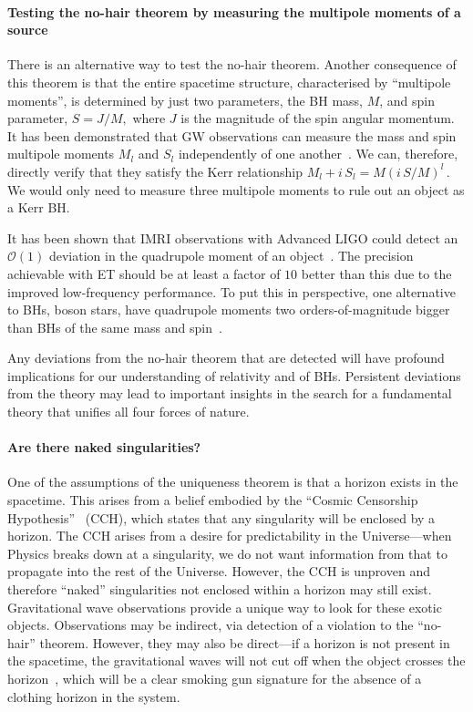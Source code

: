 \paragraph{Testing the no-hair theorem by measuring the multipole 
moments of a source}
There is an alternative way to test the no-hair theorem.
Another consequence of this theorem is 
that the entire spacetime structure, characterised by 
``multipole moments'', is determined by just two parameters, the BH 
mass, $M$, and spin parameter, $S=J/M,$ where $J$ is the magnitude of
the spin angular momentum. It has been demonstrated 
that GW observations can measure the mass and spin multipole moments 
$M_l$ and $S_l$ independently of one another~\cite{ryan95}. We can, 
therefore, directly verify that they satisfy the Kerr relationship
$ M_l + i\,S_l = M(i\,S/M)^l\,. $
We would only need to measure three multipole moments to rule out 
an object as a Kerr BH.

It has been shown that IMRI observations with Advanced LIGO could 
detect an $\mathcal{O}(1)$ deviation in the quadrupole moment of 
an object~\cite{LIGOimri}. The precision achievable with ET should 
be at least a factor of $10$ better than this due to the improved 
low-frequency performance. To put this in perspective, one alternative 
to BHs, boson stars, have quadrupole moments two orders-of-magnitude 
bigger than BHs of the same mass and spin~\cite{ryanBS}.

Any deviations from the no-hair theorem that are detected will have 
profound implications for our understanding of relativity and of BHs. 
Persistent deviations from the theory may lead to important insights 
in the search for a fundamental theory that unifies all four forces 
of nature.
\paragraph{Are there naked singularities?}
One of the assumptions of the uniqueness theorem is that a horizon exists in the spacetime. This arises from a belief embodied by the ``Cosmic Censorship Hypothesis''~\cite{CCH} (CCH), which states that any singularity will be enclosed by a horizon. The CCH arises from a desire for predictability in the Universe---when Physics breaks down at a singularity, we do not want information from that to propagate into the rest of the Universe. However, the CCH is unproven and therefore ``naked'' singularities not enclosed within a horizon may still exist. Gravitational wave observations provide a unique way to look for these exotic objects. Observations may be indirect, via detection of a violation to the ``no-hair'' theorem. However, they may also be direct---if a horizon is not present in the spacetime, the gravitational waves will not cut off when the object crosses the horizon~\cite{kesden05}, which will be a clear smoking gun signature for the absence of a clothing horizon in the system.


